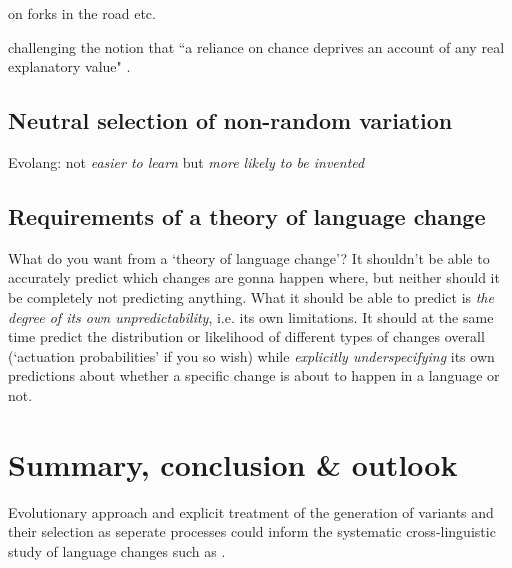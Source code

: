 \citep[ch.7-12]{Labov2010} on forks in the road etc.

challenging the notion that ``a reliance on chance deprives an account of any real explanatory value" \citep[p.44]{Joseph2013}.

\subsection{Neutral selection of non-random variation}

Evolang: not \emph{easier to learn} but \emph{more likely to be invented}



\subsection{Requirements of a theory of language change}


What do you want from a `theory of language change'? It shouldn't be able to accurately predict which changes are gonna happen where, but neither should it be completely not predicting anything. What it should be able to predict is \emph{the degree of its own unpredictability}, i.e. its own limitations. It should at the same time predict the distribution or likelihood of different types of changes overall (`actuation probabilities' if you so wish) while \emph{explicitly underspecifying} its own predictions about whether a specific change is about to happen in a language or not.



\section{Summary, conclusion \& outlook}

Evolutionary approach and explicit treatment of the generation of variants and their selection as seperate processes could inform the systematic cross-linguistic study of language changes such as \citet{Bickel2015}.%
